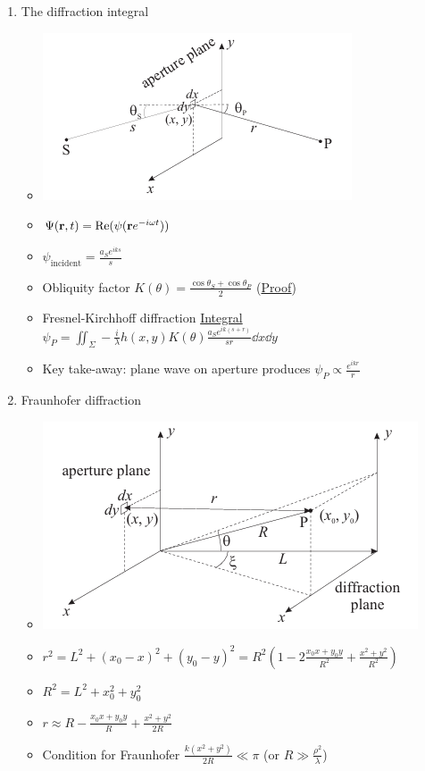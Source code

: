 \documentclass{article}
\theoremstyle{remark}
\theoremstyle{remark}
\newcommand{\mylabel}[2]{\hyperref[#1]{#2}\label{back:#1}}
\begin{document}
\begin{enumerate}
\begin{minipage}{0.3\linewidth}
        \end{minipage}
    \item The diffraction integral\begin{itemize}
            \item \includegraphics*[width=0.5\linewidth]{aperture_plane.png}
            \item $\Psi(\vb{r},t)=\Re(\psi(\vb{r}e^{-i\omega t}))$
            \item $\psi_{\mathrm{incident}}=\frac{a_Se^{iks}}{s}$
            \item Obliquity factor $\boxed{K(\theta)=\frac{\cos\theta_S+\cos\theta_P}{2}}$ (\mylabel{obliquity_factor}{Proof})
            \item Fresnel-Kirchhoff diffraction \mylabel{FKdiffIntegral}{Integral} $\psi_P=\iint_\Sigma -\frac{i}{\lambda}h(x,y)K(\theta)\frac{a_S e^{ik(s+r)}}{sr}\dd x\dd y$
            \item Key take-away: plane wave on aperture produces $\boxed{\psi_P\propto \frac{e^{ikr}}{r}}$
        \end{itemize}
    \item Fraunhofer diffraction\begin{itemize}
            \item \includegraphics*[width=0.6\linewidth]{fraunhofer_diffraction.png}
            \item $r^2 = L^2+(x_0-x)^2+(y_0-y)^2 = R^2\left(1-2\frac{x_0x+y_0y}{R^2}+\frac{x^2+y^2}{R^2}\right)$
            \item $R^2=L^2+x_0^2+y_0^2$
            \item $r\approx R-\frac{x_0 x+y_0 y}{R}+\frac{x^2+y^2}{2R}$
            \item Condition for Fraunhofer $\boxed{\frac{k(x^2+y^2)}{2R}\ll\pi}$ (or $R\gg\frac{\rho^2}{\lambda}$)

\end{itemize}
\end{enumerate}
\end{document}

